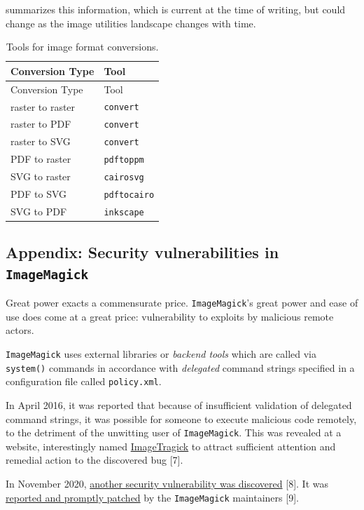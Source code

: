 \documentclass[
  11pt,
  british,
  a4paper,
]{article}
\begin{document}
 summarizes this information, which is current at the
time of writing, but could change as the image utilities landscape
changes with time.

\begin{longtable}[]{@{}ll@{}}
\caption{Tools for image format conversions.
\label{tbl:formats}}\tabularnewline
\toprule
Conversion Type & Tool \\
\midrule
\endfirsthead
\toprule
Conversion Type & Tool \\
\midrule
\endhead
raster to raster & \texttt{convert} \\
raster to PDF & \texttt{convert} \\
raster to SVG & \texttt{convert} \\
PDF to raster & \texttt{pdftoppm} \\
SVG to raster & \texttt{cairosvg} \\
PDF to SVG & \texttt{pdftocairo} \\
SVG to PDF & \texttt{inkscape} \\
\bottomrule
\end{longtable}

\hypertarget{appendix-security-vulnerabilities-in-imagemagick}{%
\subsection{\texorpdfstring{Appendix: Security vulnerabilities in
\texttt{ImageMagick}}{Appendix: Security vulnerabilities in ImageMagick}}\label{appendix-security-vulnerabilities-in-imagemagick}}

Great power exacts a commensurate price. \texttt{ImageMagick}'s great
power and ease of use does come at a great price: vulnerability to
exploits by malicious remote actors.

\texttt{ImageMagick} uses external libraries or \emph{backend tools}
which are called via \texttt{system()} commands in accordance with
\emph{delegated} command strings specified in a configuration file
called \texttt{policy.xml}.

In April 2016, it was reported that because of insufficient validation
of delegated command strings, it was possible for someone to execute
malicious code remotely, to the detriment of the unwitting user of
\texttt{ImageMagick}. This was revealed at a website, interestingly
named \href{https://imagetragick.com/}{ImageTragick} to attract
sufficient attention and remedial action to the discovered bug {[}7{]}.

In November 2020,
\href{https://portswigger.net/daily-swig/imagemagick-pdf-parsing-flaw-allowed-attacker-to-execute-shell-commands-via-maliciously-crafted-image}{another
security vulnerability was discovered} {[}8{]}. It was
\href{https://insert-script.blogspot.com/2020/11/imagemagick-shell-injection-via-pdf.html}{reported
and promptly patched} by the \texttt{ImageMagick} maintainers {[}9{]}.
\end{document}
